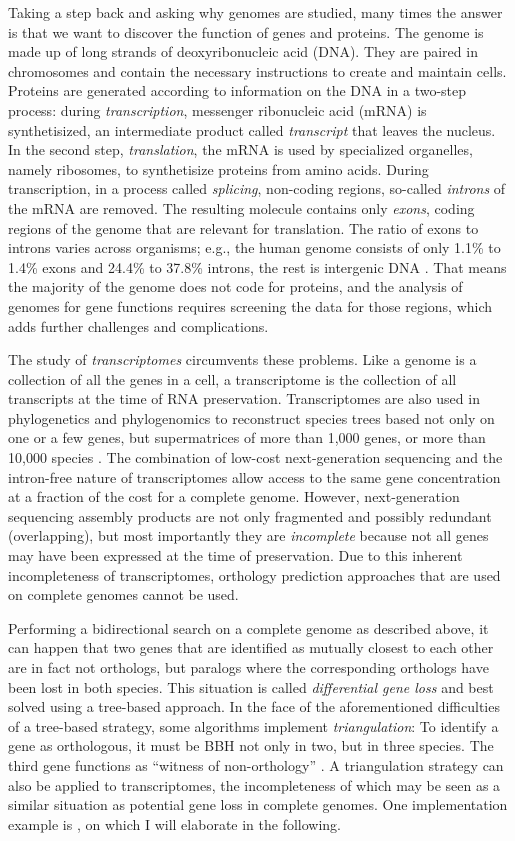 Taking a step back and asking why genomes are studied, many times the answer is
that we want to discover the function of genes and proteins. The genome is made
up of long strands of deoxyribonucleic acid (DNA). They are paired in
chromosomes and contain the necessary instructions to create and maintain cells.
Proteins are generated according to information on the DNA in a two-step
process: during \emph{transcription}, messenger ribonucleic acid (mRNA) is
synthetisized, an intermediate product called \emph{transcript} that leaves the
nucleus. In the second step, \emph{translation}, the mRNA is used by specialized
organelles, namely ribosomes, to synthetisize proteins from amino acids. During
transcription, in a process called \emph{splicing}, non-coding regions,
so-called \emph{introns} of the mRNA are removed. The resulting molecule
contains only \emph{exons}, coding regions of the genome that are relevant for
translation. The ratio of exons to introns varies across organisms; e.g., the
human genome consists of only 1.1\% to 1.4\% exons and 24.4\% to 37.8\% introns,
the rest is intergenic DNA \citep{venter2001}. That means the majority of the
genome does not code for proteins, and the analysis of genomes for gene
functions requires screening the data for those regions, which adds further
challenges and complications.

The study of \emph{transcriptomes} circumvents these problems. Like a genome is
a collection of all the genes in a cell, a transcriptome is the collection of
all transcripts at the time of RNA preservation. Transcriptomes are also used in
phylogenetics and phylogenomics to reconstruct species trees based not only on
one or a few genes, but supermatrices of more than 1,000 genes, or more than
10,000 species \citep{beiko2011}. The combination of low-cost next-generation
sequencing and the intron-free nature of transcriptomes allow access to the same
gene concentration at a fraction of the cost for a complete genome. However,
next-generation sequencing assembly products are not only fragmented and possibly
redundant (overlapping), but most importantly they are \emph{incomplete} because
not all genes may have been expressed at the time of preservation. Due to this
inherent incompleteness of transcriptomes, orthology prediction approaches that
are used on complete genomes cannot be used.

Performing a bidirectional search on a complete genome as described above, it
can happen that two genes that are identified as mutually closest to each other
are in fact not orthologs, but paralogs where the corresponding orthologs have
been lost in both species. This situation is called \emph{differential gene
loss} and best solved using a tree-based approach. In the face of the
aforementioned difficulties of a tree-based strategy, some algorithms implement
\emph{triangulation}: To identify a gene as orthologous, it must be BBH not only
in two, but in three species. The third gene functions as ``witness of
non-orthology'' \citep{dessimoz2006}. A triangulation strategy can also be
applied to transcriptomes, the incompleteness of which may be seen as a similar
situation as potential gene loss in complete genomes. One implementation example
is \hamstr \citep{ebersberger2009}, on which I will elaborate in the following.
